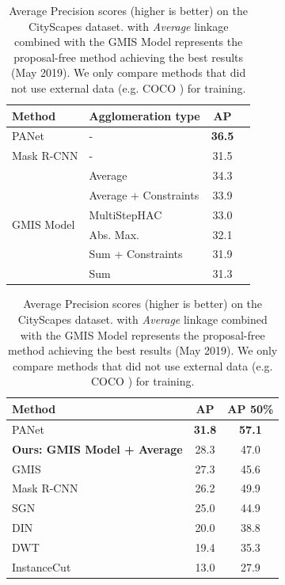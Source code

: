 \begin{table}[t]
\centering
\begin{subtable}{0.5 \textwidth}
    \centering
    \scriptsize
        \begin{tabular}{l|l|cc}
            Method & Agglomeration type & AP \\ \midrule
            PANet \cite{liu2018path} & - & \textbf{36.5} \\
            Mask R-CNN \cite{he2017mask} & - & 31.5 \\ \hline
             & \algname{} Average& 34.3 \\
             & \algname{} Average + Constraints & 33.9 \\
            \multirow{2}{*}{GMIS Model \cite{liu2018affinity}} & MultiStepHAC \cite{liu2018affinity} & 33.0 \\
             & \algname{} Abs. Max. \cite{wolf2018mutex}  & 32.1 \\
             & \algname{} Sum + Constraints  \cite{levinkov2017comparative} & 31.9  \\
             & \algname{} Sum \cite{keuper2015efficient} & 31.3 \\
        \end{tabular}
    \caption{CityScapes \emph{validation} set}
    \label{tab:results_cityscapes_val}
\end{subtable}\hfill
\begin{subtable}{0.46\textwidth}
\centering
    \scriptsize
\begin{tabular}{l|cc}
           Method & AP  & AP 50\% \\ \midrule
           PANet \cite{liu2018path} & \textbf{31.8} & \textbf{57.1} \\
           \textbf{Ours: GMIS Model + \algname{} Average} & 28.3 & 47.0 \\ 
           GMIS \cite{liu2018affinity} & 27.3 & 45.6 \\
           Mask R-CNN \cite{he2017mask} & 26.2 & 49.9 \\
           SGN \cite{liu2017sgn} & 25.0 & 44.9 \\
           DIN \cite{arnab2017pixelwise} & 20.0 & 38.8 \\
           DWT \cite{bai2017deep} & 19.4 & 35.3 \\
           InstanceCut \cite{kirillov2017instancecut} & 13.0 & 27.9 \\
        \end{tabular}
    \caption{CityScapes \emph{test} set}
    \label{tab:results_cityscapes_test}
\end{subtable}
\caption{Average Precision scores (higher is better) on the CityScapes dataset. \algname{} with \emph{Average} linkage combined with the GMIS Model \cite{liu2018affinity} represents the proposal-free method achieving the best results (May 2019). We only compare methods that did not use external data (e.g. COCO \cite{lin2014microsoft}) for training.}
\end{table}

